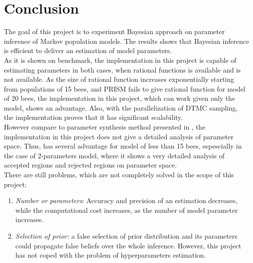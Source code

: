\documentclass[12pt]{article}
\theoremstyle{definition}
\begin{document}
\section{Conclusion}
The goal of this project is to experiment Bayesian approach on parameter
inference of Markov population models. The results shows that Bayesian inference
is efficient to deliver an estimation of model parameters.\\
As it is shown on benchmark, the implementation in this project is capable of
estimating parameters in both cases, when rational functions is available and is
not available. As the size of rational function increases exponentially starting
from populations of 15 bees, and PRISM fails to give rational function for model
of 20 bees, the implementation in this project, which can work given only the
model, shows an advantage. Also, with the parallelization of DTMC sampling, the
implementation proves that it has significant scalability.\\
However compare to parameter synthesis method presented in \cite{hajnal2019data}, the
implementation in this project does not give a detailed analysis of parameter
space. Thus, \cite{hajnal2019data} has several advantage for model of less than
15 bees, espescially in the case of 2-parameters model, where it shows a very
detailed analysis of accepted regions and rejected regions on parameter space.\\
There are still problems, which are not completely solved in the scope of this project:
\begin{enumerate}
\item \textit{Number or parameters}: Accuracy and precision of an estimation
  decreases, while the computational cost increases, as the number of model
  parameter increases.
\item \textit{Selection of prior:} a false selection of prior distribution and
  its parameters could propagate false beliefs over the whole inference.
  However, this project has not coped with the problem of hyperparameters
  estimation.
\end{enumerate}





\newpage
\printbibliography
\end{document}
